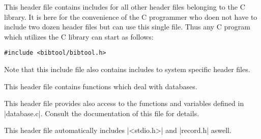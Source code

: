 

This header file contains includes for all other header files
belonging to the \BibTool{} C library. It is here for the
convenience of the C programmer who doen not have to include
two dozen header files but can use this single file. Thus any
C program which utilizes the \BibTool{} C library can start as
follows:

\verb|#include <bibtool/bibtool.h>|

Note that this include file also contains includes to system
specific header files.



This header file contains functions which deal with databases. 

This header file provides also access to the functions and
variables defined in |database.c|. Consult the documentation
of this file for details.

This header file automatically includes |<stdio.h>| and
|record.h| aswell.


